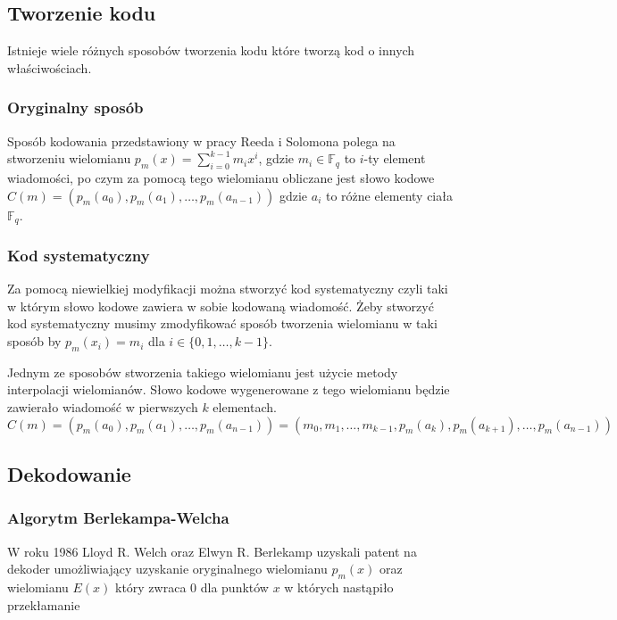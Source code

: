\subsection{Tworzenie kodu}
Istnieje wiele różnych sposobów tworzenia kodu które tworzą kod o innych właściwościach.


\subsubsection{Oryginalny sposób}
Sposób kodowania przedstawiony w pracy Reeda i Solomona polega na stworzeniu wielomianu $p_m(x)=\sum_{i=0}^{k-1}m_{i}x^i$, gdzie $m_i\in\mathbb{F}_q$ to $i$\nobreakdash-ty element wiadomości, po czym za pomocą tego wielomianu obliczane jest słowo kodowe $C(m)=(p_m(a_0), p_m(a_1), \ldots, p_m(a_{n-1}))$ gdzie $a_i$ to różne elementy ciała $\mathbb{F}_q$.

\subsubsection{Kod systematyczny}
Za pomocą niewielkiej modyfikacji można stworzyć kod systematyczny czyli taki w którym słowo kodowe zawiera w sobie kodowaną wiadomość.
Żeby stworzyć kod systematyczny musimy zmodyfikować sposób tworzenia wielomianu w taki sposób by $p_m(x_i)=m_i$ dla $i \in \{0,1,\ldots,k-1\}$.

Jednym ze sposobów stworzenia takiego wielomianu jest użycie metody interpolacji wielomianów. Słowo kodowe wygenerowane z tego wielomianu będzie zawierało wiadomość w pierwszych $k$ elementach.
\[C(m)=(p_m(a_0), p_m(a_1), \ldots, p_m(a_{n-1}))=(m_0, m_1, \ldots, m_{k-1}, p_m(a_k), p_m(a_{k+1}), \ldots, p_m(a_{n-1}))\]

\subsection{Dekodowanie}
\subsubsection{Algorytm Berlekampa-Welcha}
W roku 1986 Lloyd R. Welch oraz Elwyn R. Berlekamp uzyskali patent na dekoder umożliwiający uzyskanie oryginalnego wielomianu $p_m(x)$ oraz wielomianu $E(x)$ który zwraca 0 dla punktów $x$ w których nastąpiło przekłamanie~\cite{Berlekamp-Welch}
